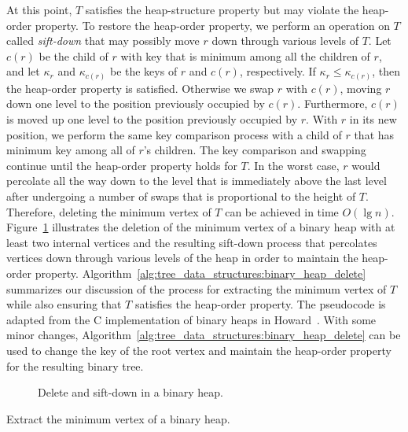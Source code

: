 At this point, $T$ satisfies the heap-structure property but may
violate the heap-order property. To restore the heap-order property,
we perform an operation on $T$ called
\emph{sift-down} that may possibly move
$r$ down through various levels of $T$. Let $c(r)$ be the child of $r$
with key that is minimum among all the children of $r$, and let
$\kappa_r$ and $\kappa_{c(r)}$ be the keys of $r$ and $c(r)$,
respectively. If $\kappa_r \leq \kappa_{c(r)}$, then the heap-order
property is satisfied. Otherwise we swap $r$ with $c(r)$, moving $r$
down one level to the position previously occupied by
$c(r)$. Furthermore, $c(r)$ is moved up one level to the position
previously occupied by $r$. With $r$ in its new position, we perform
the same key comparison process with a child of $r$ that has minimum
key among all of $r$'s children. The key comparison and swapping
continue until the heap-order property holds for $T$. In the worst
case, $r$ would percolate all the way down to the level that is
immediately above the last level after undergoing a number of swaps
that is proportional to the height of $T$. Therefore, deleting the
minimum vertex of $T$ can be achieved in time $O(\lg n)$.
Figure~\ref{fig:tree_data_structures:delete_sift_down_binary_heap}
illustrates the deletion of the minimum vertex of a binary heap with
at least two internal vertices and the resulting sift-down process
that percolates vertices down through various levels of the heap in
order to maintain the heap-order property.
Algorithm~\ref{alg:tree_data_structures:binary_heap_delete} summarizes
our discussion of the process for extracting the minimum vertex of $T$
while also ensuring that $T$ satisfies the heap-order property. The
pseudocode is adapted from the C implementation of binary heaps in
Howard~\cite{Howard2010}. With some minor changes,
Algorithm~\ref{alg:tree_data_structures:binary_heap_delete} can be
used to change the key of the root vertex and maintain the heap-order
property for the resulting binary tree.

\begin{figure}[!htbp]
\centering

\caption{Delete and sift-down in a binary heap.}
\label{fig:tree_data_structures:delete_sift_down_binary_heap}
\end{figure}

\begin{algorithm}[!htbp]

\caption{Extract the minimum vertex of a binary heap.}
\label{alg:tree_data_structures:binary_heap_delete}
\end{algorithm}


